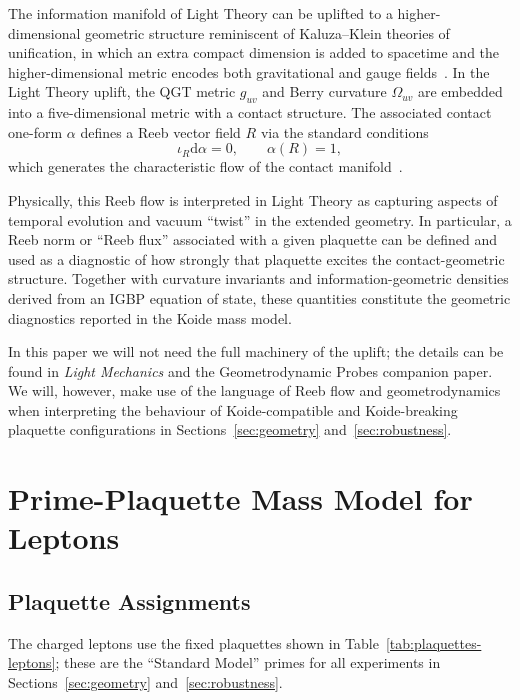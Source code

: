\documentclass[12pt]{article}
\begin{document}
The information manifold of Light Theory can be uplifted to a higher-dimensional
geometric structure reminiscent of Kaluza--Klein theories of unification, in
which an extra compact dimension is added to spacetime and the higher-dimensional metric encodes both gravitational and gauge fields~\cite{Kaluza1921,Klein1926,KaluzaKleinReview}.  In the Light Theory uplift, the QGT metric
$g_{uv}$ and Berry curvature $\Omega_{uv}$ are embedded into a five-dimensional
metric with a contact structure.  The associated contact one-form
$\alpha$ defines a Reeb vector field $R$ via the standard conditions
\begin{equation}
  \iota_R \mathrm{d}\alpha = 0,
  \qquad
  \alpha(R) = 1,
\end{equation}
which generates the characteristic flow of the contact manifold~\cite{ReebVectorFieldReview,ContactGeometryNotes}.

Physically, this Reeb flow is interpreted in Light Theory as capturing aspects
of temporal evolution and vacuum ``twist'' in the extended geometry.  In
particular, a Reeb norm or ``Reeb flux'' associated with a given plaquette can
be defined and used as a diagnostic of how strongly that plaquette excites the
contact-geometric structure.  Together with curvature invariants and
information-geometric densities derived from an IGBP equation of state, these
quantities constitute the geometric diagnostics reported in the Koide mass
model.

In this paper we will not need the full machinery of the uplift; the details
can be found in \emph{Light Mechanics} and the Geometrodynamic Probes
companion paper.  We will, however, make use of the language of Reeb flow and
geometrodynamics when interpreting the behaviour of Koide-compatible and
  Koide-breaking plaquette configurations in Sections~\ref{sec:geometry}
  and~\ref{sec:robustness}.

\section{Prime-Plaquette Mass Model for Leptons}
\label{sec:mass-model}

\subsection{Plaquette Assignments}
The charged leptons use the fixed plaquettes shown in
Table~\ref{tab:plaquettes-leptons}; these are the ``Standard Model'' primes for
all experiments in Sections~\ref{sec:geometry} and~\ref{sec:robustness}.
\end{document}
